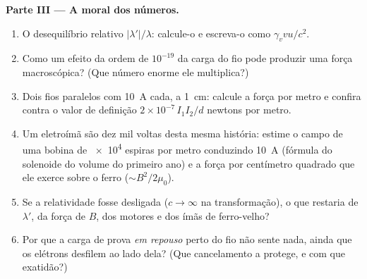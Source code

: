 \begin{problem}
\medskip\noindent\textbf{Parte III --- A moral dos números.}
\begin{enumerate}[resume]
  \item O desequilíbrio relativo $|\lambda'|/\lambda$: calcule-o e
        escreva-o como $\gamma_v vu/c^2$.
  \item Como um efeito da ordem de $10^{-19}$ da carga do fio pode
        produzir uma força macroscópica? (Que número enorme ele
        multiplica?)
  \item Dois fios paralelos com \qty{10}{A} cada, a \qty{1}{cm}:
        calcule a força por metro e confira contra o valor de
        definição $2 \times 10^{-7}\,I_1I_2/d$ newtons por metro.
  \item Um eletroímã são dez mil voltas desta mesma história: estime o
        campo de uma bobina de \qty{e4}{} espiras por metro conduzindo
        \qty{10}{A} (fórmula do solenoide do volume do primeiro ano) e
        a força por centímetro quadrado que ele exerce sobre o ferro
        ($\sim B^2/2\mu_0$).
  \item Se a relatividade fosse desligada ($c \to \infty$ na
        transformação), o que restaria de $\lambda'$, da força de $B$,
        dos motores e dos ímãs de ferro-velho?
  \item Por que a carga de prova \emph{em repouso} perto do fio não
        sente nada, ainda que os elétrons desfilem ao lado dela? (Que
        cancelamento a protege, e com que exatidão?)
\end{enumerate}


\end{problem}
